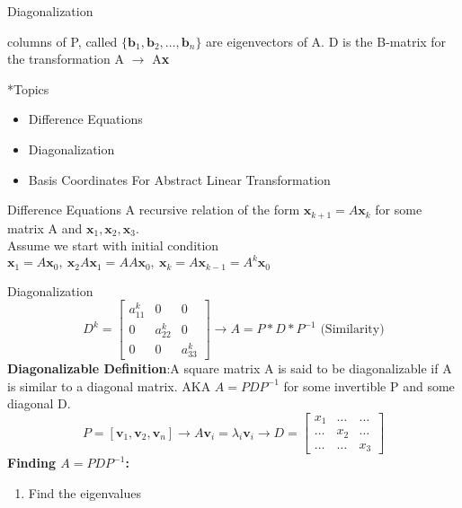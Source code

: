 \documentclass[a4paper, 12pt]{article}
\begin{document}
\begin{section}{Diagonalization}
\begin{subsection}
\begin{itemize}
columns of P, called $\{\textbf{b}_{1},\textbf{b}_{2},\ldots,\textbf{b}_{n}\}$ are 
eigenvectors of A. D is the B-matrix for the transformation A $\to$ A\textbf{x}
\end{itemize}
\end{subsection}
\begin{subsection}*{Topics}
\begin{itemize}
\item{Difference Equations}
\item{Diagonalization}
\item{Basis Coordinates For Abstract Linear Transformation}

\end{itemize}
\end{subsection}
\begin{subsection}{Difference Equations}
A recursive relation of the form $\textbf{x}_{k+1}=A\textbf{x}_{k}$ for some matrix
A and $\textbf{x}_{1},\textbf{x}_{2},\textbf{x}_{3}$.\\
Assume we start with initial condition $\textbf{x}_{1}=A\textbf{x}_{0},~\textbf{x}_{2}
A\textbf{x}_{1}=AA\textbf{x}_{0},~ \textbf{x}_{k}=A\textbf{x}_{k-1}=
A^{k}\textbf{x}_{0}$
\end{subsection}
\begin{subsection}{Diagonalization}
\begin{equation} \label{Diagonal Exponents}
D^{k}=\begin{bmatrix} a_{11}^{k} &0 &0 \\0& a_{22}^{k} & 0\\ 0& 0& a_{33}^{k} 
\end{bmatrix} \to A=P*D*P^{-1} \mbox{ (Similarity)}
\end{equation}
\textbf{Diagonalizable Definition}:A square matrix A is said to be diagonalizable if
A is similar to a diagonal matrix. AKA $A=PDP^{-1}$ for some invertible P and some 
diagonal D.\\
\begin{equation}
P=[\textbf{v}_{1}, \textbf{v}_{2}, \textbf{v}_{n}] \to A\textbf{v}_{i}=\lambda_{i}
\textbf{v}_{i} \to D= \begin{bmatrix} x_1 & \ldots & \ldots\\ \ldots & x_2 & \ldots
\\ \ldots & \ldots &x_3\end{bmatrix} 
\end{equation}
\textbf{Finding $A=PDP^{-1}$:}
\begin{enumerate}
\item{Find the eigenvalues}

\end{enumerate}
\end{subsection}
\end{section}
\end{document}
